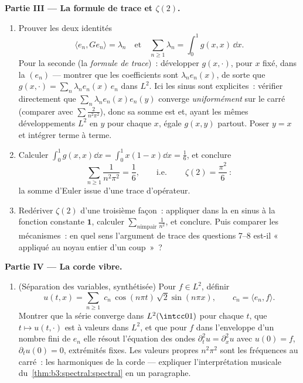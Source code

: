 \begin{problem}
\medskip
\noindent\textbf{Partie III --- La formule de trace et
$\zeta(2)$.}
\begin{enumerate}[resume]
  \item Prouver les deux identités
        \[
        \langle e_n, Ge_n\rangle = \lambda_n
        \quad\text{et}\quad
        \sum_{n\geq1}\lambda_n = \int_0^1 g(x,x)\,\dd x .
        \]
        Pour la seconde (la \emph{formule de trace})~:
        développer $g(x, \cdot)$, pour $x$ fixé, dans la 
        $(e_n)$ --- montrer que les coefficients sont
        $\lambda_ne_n(x)$, de sorte que $g(x, \cdot) =
        \sum_n\lambda_ne_n(x)\,e_n$ dans $L^2$. Ici les sinus
        sont explicites~: vérifier directement que
        $\sum_n\lambda_ne_n(x)e_n(y)$ converge
        \emph{uniformément} sur le carré (comparer avec
        $\sum \frac2{n^2\pi^2}$), donc sa somme est 
        et, ayant les mêmes développements $L^2$ en $y$ pour
        chaque $x$, égale $g(x,y)$ partout. Poser $y = x$ et
        intégrer terme à terme.
  \item Calculer $\int_0^1g(x,x)\dd x = \int_0^1x(1-x)\dd x =
        \frac16$, et conclure
        \[
        \sum_{n\geq1}\frac{1}{n^2\pi^2} = \frac16,
        \qquad\text{i.e.}\qquad
        \boxed{\ \zeta(2) = \frac{\pi^2}{6}\ } :
        \]
        la somme d'Euler issue d'une trace d'opérateur.
  \item Redériver $\zeta(2)$ d'une troisième façon~: appliquer
         dans la  en sinus à la fonction
        constante $\mathbf 1$, calculer $\sum_{n \text{
        impair}}\frac1{n^2}$, et conclure. Puis comparer les
        mécanismes~: en quel sens l'argument de trace des
        questions 7--8 est-il «~ appliqué au noyau
        entier d'un coup~»~?
\end{enumerate}

\medskip
\noindent\textbf{Partie IV --- La corde vibre.}
\begin{enumerate}[resume]
  \item (Séparation des variables, synthétisée) Pour $f \in
        L^2$, définir
        \[
        u(t, x) = \sum_{n\geq1}\;c_n\,
        \cos(n\pi t)\,\sqrt2\sin(n\pi x),
        \qquad c_n = \langle e_n, f\rangle .
        \]
        Montrer que la série converge dans $L^2(\intcc01)$
        pour chaque $t$, que $t\mapsto u(t, \cdot)$ est
         à valeurs dans $L^2$, et que pour $f$ dans
        l'enveloppe d'un nombre fini de $e_n$ elle résout
        l'équation des ondes $\partial_t^2u =
        \partial_x^2u$ avec $u(0) = f$, $\partial_tu(0) =
        0$, extrémités fixes. Les valeurs propres $n^2\pi^2$
        sont les fréquences au carré~: les harmoniques de la
        corde --- expliquer l'interprétation musicale du~\cref{thm:b3:spectral:spectral} en un paragraphe.
\end{enumerate}


\end{problem}
